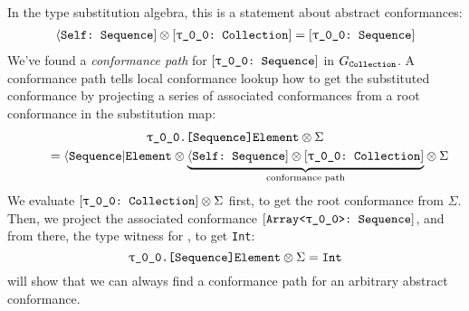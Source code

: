 \documentclass[../generics]{subfiles}
\begin{document}
\begin{example}
\begin{gather*}
\end{gather*}
In the type substitution algebra, this is a statement about abstract conformances:
\begin{gather*}
\AssocConf{Self}{Sequence} \otimes \ConfReq{\rT}{Collection} = \ConfReq{\rT}{Sequence}
\end{gather*}
We've found a \emph{conformance path} for $\ConfReq{\rT}{Sequence}$ in $G_{\texttt{Collection}}$. A conformance path tells local conformance lookup how to get the substituted conformance by projecting a series of associated conformances from a root conformance in the substitution map:
\begin{gather*}
\texttt{\rT.[Sequence]Element} \otimes \Sigma \\
\qquad {} = \AElement \otimes {\underbrace{\AssocConf{Self}{Sequence} \otimes \ConfReq{\rT}{Collection}\strut}_{\text{conformance path}}} \otimes \Sigma
\end{gather*}
We evaluate $\ConfReq{\rT}{Collection} \otimes \Sigma$ first, to get the root conformance from $\Sigma$. Then, we project the associated conformance $\ConfReq{Array<\rT>}{Sequence}$, and from there, the type witness for \nElement, to get \texttt{Int}:
\[\texttt{\rT.[Sequence]Element} \otimes \Sigma = \texttt{Int}\]
 will show that we can always find a conformance path for an arbitrary abstract conformance.
\end{example}
\end{document}
